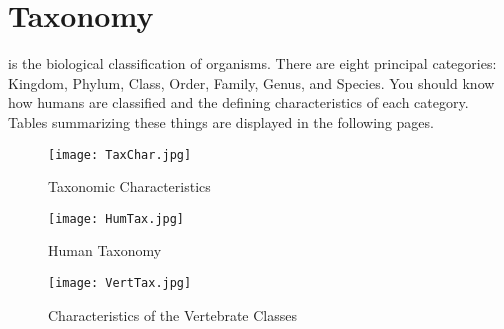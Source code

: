 \documentclass[../Bio_chemistryReview.tex]{subfiles}
\begin{document}
\section{Taxonomy}
 is the biological classification of organisms. There are
eight principal categories: Kingdom, Phylum, Class, Order, Family, Genus, and
Species. You should know how humans are classified and the defining
characteristics of each category. Tables summarizing these things are displayed
in the following pages.
\begin{figure}[H]
  \centering
  \texttt{[image: TaxChar.jpg]}
  \caption{Taxonomic Characteristics}
\end{figure}
\begin{figure}[H]
  \centering
  \texttt{[image: HumTax.jpg]}
  \caption{Human Taxonomy}
\end{figure}
\begin{figure}[H]
  \centering
  \texttt{[image: VertTax.jpg]}
  \caption{Characteristics of the Vertebrate Classes}
\end{figure}
\end{document}
